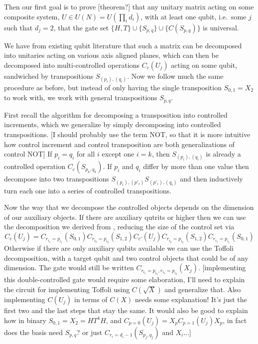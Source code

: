 Then our first goal is to prove [theorem?] that any unitary matrix acting on some composite system, $U \in U(N) = U(\prod_i d_i)$, with at least one qubit, i.e.\ some $j$ such that $d_j = 2$, that the gate set $\{H, T\} \cup \{S_{p,q}\} \cup \{C(S_{p,q})\}$ is universal.

We have from existing qubit literature that such a matrix can be decomposed into unitaries acting on various axis aligned planes, which can then be decomposed into multi-controlled operations $C_c(U_j)$ acting on some qubit, sandwiched by transpositions $S_{(p_i),(q_i)}$. Now we follow much the same procedure as before, but instead of only having the single transposition $S_{0, 1} = X_2$ to work with, we work with general transpositions $S_{p, q}$.

First recall the algorithm for decomposing a transposition into controlled increments, which we generalize by simply decomposing into controlled transpositions. [I should probably use the term NOT, so that it is more intuitive how control increment and control transposition are both generalizations of control NOT] If $p_i = q_i$ for all $i$ except one $i = k$, then $S_{(p_i), (q_i)}$ is already a controlled operation $C_c(S_{p_k,q_k})$. If $p_i$ and $q_i$ differ by more than one value then decompose into two transpositions $S_{(p_i), (p'_i)}S_{(p'_i), (q_i)}$ and then inductively turn each one into a series of controlled transpositions.

Now the way that we decompose the controlled objects depends on the dimension of our auxiliary objects. If there are auxiliary qutrits or higher then we can use the decomposition we derived from \cite{multi-valued-logic}, reducing the size of the control set via
\[
C_c(U_j) = C_{r_{i_1}=p_{i_1}}(S_{0,1})
C_{r_{i_2}=p_{i_2}}(S_{1,2})
C_{c'}(U_j)
C_{r_{i_2}=p_{i_2}}(S_{1,2})
C_{r_{i_1}=p_{i_1}}(S_{0,1})
\]
Otherwise if there are only auxiliary qubits available we can use the Toffoli decomposition, with a target qubit and two control objects that could be of any dimension. The gate would still be written $C_{r_{i_1}=p_{i_1},r_{i_2}=p_{i_2}}(X_j)$. [implementing this double-controlled gate would require some elaboration, I'll need to explain the circuit for implementing Toffoli using $C(\sqrt{X})$ and generalize that. Also implementing $C(U_j)$ in terms of $C(X)$ needs some explanation! It's just the first two and the last steps that stay the same. It would also be good to explain how in binary $S_{0,1} = X_2 = HT^4H$, and $C_{p=0}(U_j) = X_pC_{p=1}(U_j)X_p$, in fact does the basis need $S_{p,q}$? or just $C_{r_i=d_i-1}(S_{p_j,q_j})$ and $X_i$...]

